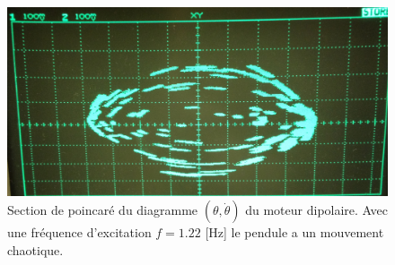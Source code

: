 \documentclass[a4paper,12pt,oneside]{article}
\begin{document}
\begin{figure}[h!]
  \begin{center}
  \includegraphics[width=0.5\linewidth,angle=0]{./figures/chao_1_22Hz_v2.jpg}
  \caption{Section de poincaré du diagramme $(\theta,\dot{\theta})$ du moteur dipolaire. Avec une fréquence d'excitation $f=1.22$ [Hz] le pendule a un mouvement chaotique.} \label{fig:chaos}
  \end{center}
\end{figure}








\end{document}
